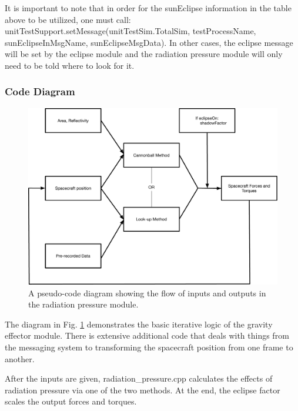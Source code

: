 It is important to note that in order for the sunEclipse information in the table above to be utilized, one must call:
unitTestSupport.setMessage(unitTestSim.TotalSim, testProcessName, sunEclipseInMsgName, sunEclipseMsgData). In other cases, the eclipse message will be set by the eclipse module and the radiation pressure module will only need to be told where to look for it.

\subsubsection{Code Diagram}

\begin{figure}[H]
	\centering \includegraphics[height=0.6\textwidth, keepaspectratio]{Figures/codeFlow.pdf}
	\caption{A pseudo-code diagram showing the flow of inputs and outputs in the radiation pressure module.}
	\label{img:codeFlow}
\end{figure}

The diagram in Fig. \ref{img:codeFlow} demonstrates the basic iterative logic of the gravity effector module. There is extensive additional code that deals with things from the messaging system to transforming the spacecraft position from one frame to another.

After the inputs are given, radiation\_pressure.cpp calculates the effects of radiation pressure via one of the two methods. At the end, the eclipse factor scales the output forces and torques.
